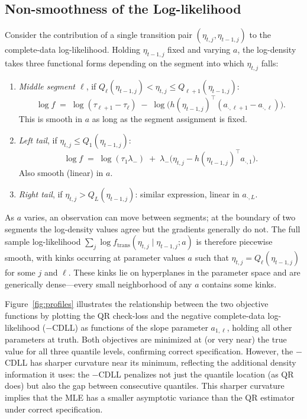 \documentclass[12pt]{article}
\begin{document}
\subsection{Non-smoothness of the Log-likelihood}

Consider the contribution of a single transition pair $(\eta_{t,j}, \eta_{t-1,j})$ to the complete-data log-likelihood. Holding $\eta_{t-1,j}$ fixed and varying $a$, the log-density takes three functional forms depending on the segment into which $\eta_{t,j}$ falls:
\begin{enumerate}
\item \emph{Middle segment $\ell$}, if $Q_{\ell}(\eta_{t-1,j}) < \eta_{t,j} \leq Q_{\ell+1}(\eta_{t-1,j})$:
\[
\log f \;=\; \log(\tau_{\ell+1} - \tau_{\ell}) \;-\; \log\!\bigl(h(\eta_{t-1,j})^{\top}(a_{\cdot,\ell+1} - a_{\cdot,\ell})\bigr).
\]
This is smooth in $a$ as long as the segment assignment is fixed.
\item \emph{Left tail}, if $\eta_{t,j} \leq Q_{1}(\eta_{t-1,j})$:
\[
\log f \;=\; \log(\tau_{1}\lambda_{-}) \;+\; \lambda_{-}\bigl(\eta_{t,j} - h(\eta_{t-1,j})^{\top} a_{\cdot,1}\bigr).
\]
Also smooth (linear) in $a$.
\item \emph{Right tail}, if $\eta_{t,j} > Q_{L}(\eta_{t-1,j})$: similar expression, linear in $a_{\cdot,L}$.
\end{enumerate}
As $a$ varies, an observation can move between segments; at the boundary of two segments the log-density values agree but the gradients generally do not. The full sample log-likelihood $\sum_{j} \log f_{\mathrm{trans}}(\eta_{t,j} \mid \eta_{t-1,j}; a)$ is therefore piecewise smooth, with kinks occurring at parameter values $a$ such that $\eta_{t,j} = Q_{\ell}(\eta_{t-1,j})$ for some $j$ and $\ell$. These kinks lie on hyperplanes in the parameter space and are generically dense---every small neighborhood of any $a$ contains some kinks.

Figure~\ref{fig:profiles} illustrates the relationship between the two objective functions by plotting the QR check-loss and the negative complete-data log-likelihood ($-$CDLL) as functions of the slope parameter $a_{1,\ell}$, holding all other parameters at truth. Both objectives are minimized at (or very near) the true value for all three quantile levels, confirming correct specification. However, the $-$CDLL has sharper curvature near its minimum, reflecting the additional density information it uses: the $-$CDLL penalizes not just the quantile location (as QR does) but also the gap between consecutive quantiles. This sharper curvature implies that the MLE has a smaller asymptotic variance than the QR estimator under correct specification.
\end{document}
